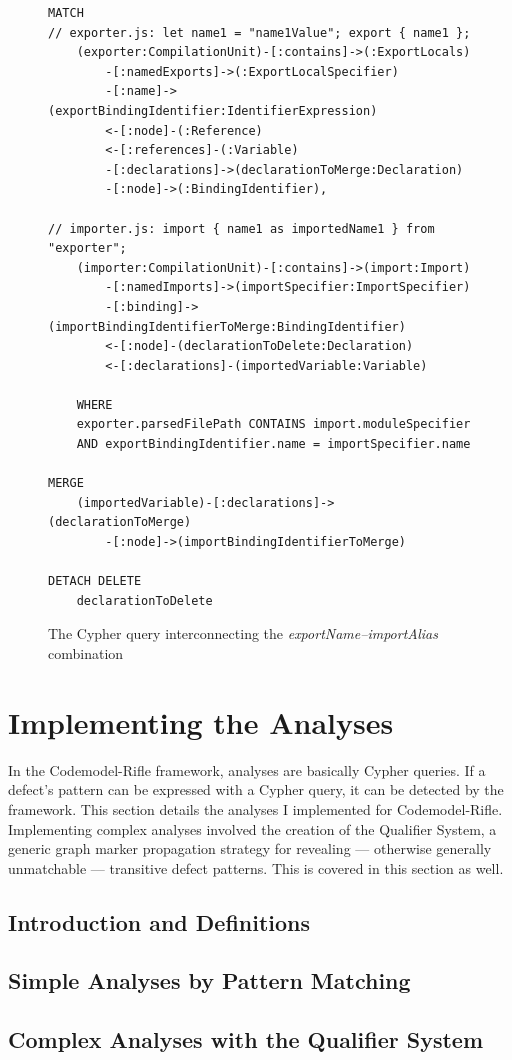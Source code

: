 \newpage
\vspace*{8.35em}
\begin{figure}[!h]
	\begin{lstlisting}[language=Cypher]
MATCH
// exporter.js: let name1 = "name1Value"; export { name1 };
    (exporter:CompilationUnit)-[:contains]->(:ExportLocals)
        -[:namedExports]->(:ExportLocalSpecifier)
        -[:name]->(exportBindingIdentifier:IdentifierExpression)
        <-[:node]-(:Reference)
        <-[:references]-(:Variable)
        -[:declarations]->(declarationToMerge:Declaration)
        -[:node]->(:BindingIdentifier),

// importer.js: import { name1 as importedName1 } from "exporter";
    (importer:CompilationUnit)-[:contains]->(import:Import)
        -[:namedImports]->(importSpecifier:ImportSpecifier)
        -[:binding]->(importBindingIdentifierToMerge:BindingIdentifier)
        <-[:node]-(declarationToDelete:Declaration)
        <-[:declarations]-(importedVariable:Variable)

    WHERE
    exporter.parsedFilePath CONTAINS import.moduleSpecifier
    AND exportBindingIdentifier.name = importSpecifier.name

MERGE
    (importedVariable)-[:declarations]->(declarationToMerge)
        -[:node]->(importBindingIdentifierToMerge)

DETACH DELETE
    declarationToDelete
	\end{lstlisting}
  \caption{The Cypher query interconnecting the \emph{exportName–importAlias} combination}
  \label{fig:export-import-example-cypher-source}
\end{figure}


\newpage
\section{Implementing the Analyses}

In the Codemodel-Rifle framework, analyses are basically Cypher queries. If a defect’s pattern can be expressed with a Cypher query, it can be detected by the framework. This section details the analyses I implemented for Codemodel-Rifle. Implementing complex analyses involved the creation of the Qualifier System, a generic graph marker propagation strategy for revealing — otherwise generally unmatchable — transitive defect patterns. This is covered in this section as well.


\subsection{Introduction and Definitions}
\subsection{Simple Analyses by Pattern Matching}
\subsection{Complex Analyses with the Qualifier System}